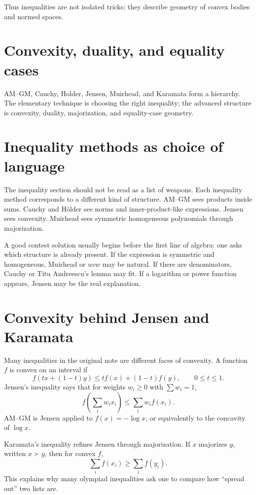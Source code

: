 Thus inequalities are not isolated tricks; they describe geometry of convex bodies and normed spaces.

\section{Convexity, duality, and equality cases}

AM--GM, Cauchy, Holder, Jensen, Muirhead, and Karamata form a hierarchy.  The elementary technique is choosing the right inequality; the advanced structure is convexity, duality, majorization, and equality-case geometry.

\section{Inequality methods as choice of language}

The inequality section should not be read as a list of weapons.  Each inequality method corresponds to a different kind of structure.  AM--GM sees products inside sums.  Cauchy and Hölder see norms and inner-product-like expressions.  Jensen sees convexity.  Muirhead sees symmetric homogeneous polynomials through majorization.

A good contest solution usually begins before the first line of algebra: one asks which structure is already present.  If the expression is symmetric and homogeneous, Muirhead or \(uvw\) may be natural.  If there are denominators, Cauchy or Titu Andreescu's lemma may fit.  If a logarithm or power function appears, Jensen may be the real explanation.

\section{Convexity behind Jensen and Karamata}

Many inequalities in the original note are different faces of convexity.  A function $f$ is convex on an interval if
\[
  f(tx+(1-t)y)\le tf(x)+(1-t)f(y),\qquad 0\le t\le1.
\]
Jensen's inequality says that for weights $w_i\ge0$ with $\sum w_i=1$,
\[
  f\left(\sum_i w_ix_i\right)\le \sum_i w_if(x_i).
\]
AM--GM is Jensen applied to $f(x)=-\log x$, or equivalently to the concavity of $\log x$.

Karamata's inequality refines Jensen through majorization.  If $x$ majorizes $y$, written $x\succ y$, then for convex $f$,
\[
  \sum_i f(x_i)\ge \sum_i f(y_i).
\]
This explains why many olympiad inequalities ask one to compare how ``spread out'' two lists are.

